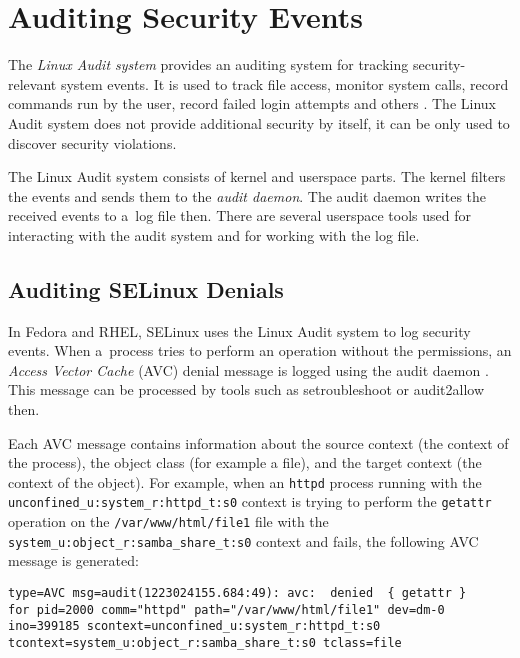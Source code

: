 \section{Auditing Security Events}

The \emph{Linux Audit system} provides an auditing system for tracking
security-relevant system events. It is used to track file access, monitor system
calls, record commands run by the user, record failed login attempts and others
\cite{secguide}. The Linux Audit system does not provide additional security by
itself, it can be only used to discover security violations.

The Linux Audit system consists of kernel and userspace parts. The kernel
filters the events and sends them to the \emph{audit daemon}. The audit daemon
writes the received events to a~log file then. There are several userspace tools
used for interacting with the audit system and for working with the log file.

\subsection{Auditing SELinux Denials}

In Fedora and RHEL, SELinux uses the Linux Audit system to log security events.
When a~process tries to perform an operation without the permissions, an
\emph{Access Vector Cache} (AVC) denial message is logged using the audit daemon
\cite{selinuxguide}. This message can be processed by tools such as
setroubleshoot or audit2allow then.

Each AVC message contains information about the source context (the context of
the process), the object class (for example a file), and the target context (the
context of the object). For example, when an \texttt{httpd} process running with
the \texttt{unconfined\_u:system\_r:httpd\_t:s0} context is trying to perform
the \texttt{getattr} operation on the \texttt{/var/www/html/file1} file with the
\texttt{system\_u:object\_r:samba\_share\_t:s0} context and fails, the following
AVC message is generated:

\begin{lstlisting}
type=AVC msg=audit(1223024155.684:49): avc:  denied  { getattr }
for pid=2000 comm="httpd" path="/var/www/html/file1" dev=dm-0
ino=399185 scontext=unconfined_u:system_r:httpd_t:s0
tcontext=system_u:object_r:samba_share_t:s0 tclass=file
\end{lstlisting}

